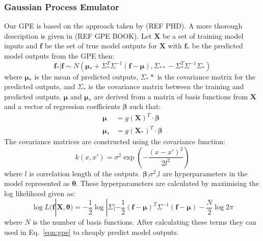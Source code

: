 \documentclass[12pt,a4paper]{article}
\begin{document}
\subsubsection{Gaussian Process Emulator}
\noindent
Our GPE is based on the approach taken by (REF PHD). A more thorough description is given in (REF GPE BOOK). Let $\bm{X}$ be a set of training model inputs and $\bm{f}$ be the set of true model outputs for $\bm{X}$ with $\bm{f}_*$ be the predicted model outputs from the GPE then:
\begin{equation}\label{eqn:gpe}
	\bm{f_*}|\bm{f}\sim N(\bm{\mu}_* + \Sigma_*^T\Sigma^{-1}(\bm{f}-\bm{\mu}),
	\Sigma_{**}-\Sigma_*^T\Sigma^{-1}\Sigma_*)
\end{equation}
where $\bm{\mu}_*$ is the mean of predicted outputs, $\Sigma_**$ is the covariance matrix for the predicted outputs, and $\Sigma_*$ is the covariance matrix between the training and predicted outputs. $\bm{\mu}$ and $\bm{\mu}_*$ are derived from a matrix of basis functions from $\bm{X}$ and a vector of regression coefficients $\bm{\beta}$ such that:
\begin{align}
	\bm{\mu} &= g(\bm{X})^T\cdot \bm{\beta} \\
	\bm{\mu}_* &= g(\bm{X}_*)^T\cdot \bm{\beta}
\end{align}
The covariance matrices are constructed using the covariance function:
\begin{equation}
	k(x,x')=\sigma^2\exp\left( -\frac{(x-x')^2}{2l^2}\right)
\end{equation}
where $l$ is correlation length of the outputs. $\bm{\beta}$,$\sigma^2$,$l$ are hyperparameters in the model represented as $\bm{\theta}$. These hyperparameters are calculated by maximising the log likelihood given as:
\begin{equation}
	\log L(\bm{f}|\bm{X},\bm{\theta})=-\frac{1}{2}\log|\Sigma|-\frac{1}{2}(\bm{f}-\bm{\mu})^T
	\Sigma^{-1}(\bm{f}-\bm{\mu})-\frac{N}{2}\log2\pi
\end{equation}
where $N$ is the number of basis functions. After calculating these terms they can used in Eq.~\eqref{eqn:gpe} to cheaply predict model outputs.
\end{document}
